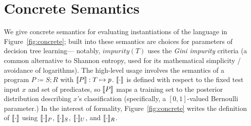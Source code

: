 \section{Concrete Semantics}

We give concrete semantics for evaluating instantiations of the language
in Figure~\ref{fig:concrete};
built into these semantics are choices for parameters of decision tree learning---%
notably, $\mathit{impurity(T)}$ uses the \emph{Gini impurity} criteria
(a common alternative to Shannon entropy, used for its mathematical simplicity
/ avoidance of logarithms).
The high-level usage involves the semantics of a program $P \coloneqq S ; R$
with $\den{P} : T \mapsto p$.
$\den{\cdot}$ is defined with respect to the fixed test input $x$ and set of predicates,
so $\den{P}$ maps a training set to the posterior distribution describing $x$'s classification
(specifically, a $[0,1]$-valued Bernoulli parameter.)
In the interest of formality, Figure~\ref{fig:concrete} writes the definition of $\den{\cdot}$
using $\den[P]{\cdot}$, $\den[S]{\cdot}$, $\den[U]{\cdot}$, and $\den[R]{\cdot}$.

